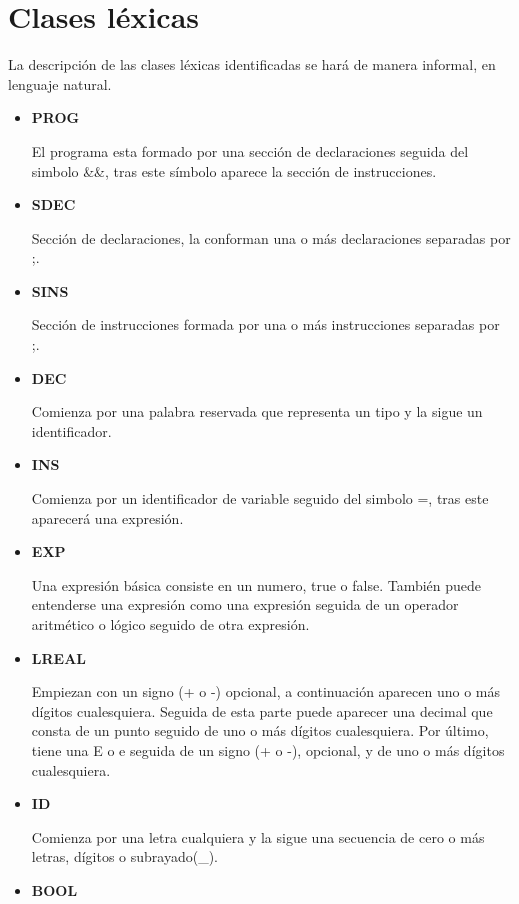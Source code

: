 \documentclass[\main/MemoriaPL.tex]{subfiles}
\begin{document}
  \section{Clases léxicas} \label{lexicon}
    \par
    La descripción de las clases léxicas identificadas se hará de manera informal, en lenguaje natural.

    \begin{itemize}
      \item \textbf{PROG}
        \par
        El programa esta formado por una sección de declaraciones seguida del simbolo \&\&, tras este símbolo aparece
        la sección de instrucciones.
      \item \textbf{SDEC}
        \par
        Sección de declaraciones, la conforman una o más declaraciones separadas por ;.
      \item \textbf{SINS}
        \par
        Sección de instrucciones formada por una o más instrucciones separadas por ;.
      \item \textbf{DEC}
        \par
        Comienza por una palabra reservada que representa un tipo y la sigue un identificador.
      \item \textbf{INS}
        \par
        Comienza por un identificador de variable seguido del simbolo =, tras este aparecerá una expresión.
      \item \textbf{EXP}
        \par
        Una expresión básica consiste en un numero, true o false. También puede entenderse una expresión como
        una expresión seguida de un operador aritmético o lógico seguido de otra expresión.
      \item \textbf{LREAL}
        \par
        Empiezan con un signo (+ o -) opcional, a continuación aparecen uno o más dígitos cualesquiera.
        Seguida de esta parte puede aparecer una decimal que consta de un punto seguido de uno o más dígitos cualesquiera.
        Por último, tiene una E o e seguida de un signo (+ o -), opcional, y de uno o más dígitos cualesquiera.
      \item \textbf{ID}
        \par
        Comienza por una letra cualquiera y la sigue una secuencia de cero o más letras, dígitos o subrayado(\_).
      \item \textbf{BOOL}

\end{itemize}
\end{document}
